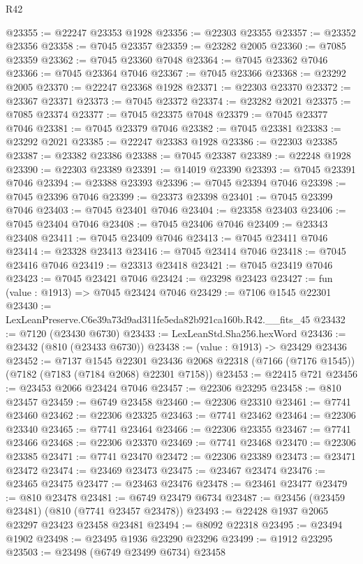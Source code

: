 \begin{lexlean}{R42}
\begin{coremodule}
{@23355 := @22247 @23353 @1928
@23356 := @22303 @23355
@23357 := @23352 @23356
@23358 := @7045 @23357
@23359 := @23282 @2005
@23360 := @7085 @23359
@23362 := @7045 @23360 @7048
@23364 := @7045 @23362 @7046
@23366 := @7045 @23364 @7046
@23367 := @7045 @23366
@23368 := @23292 @2005
@23370 := @22247 @23368 @1928
@23371 := @22303 @23370
@23372 := @23367 @23371
@23373 := @7045 @23372
@23374 := @23282 @2021
@23375 := @7085 @23374
@23377 := @7045 @23375 @7048
@23379 := @7045 @23377 @7046
@23381 := @7045 @23379 @7046
@23382 := @7045 @23381
@23383 := @23292 @2021
@23385 := @22247 @23383 @1928
@23386 := @22303 @23385
@23387 := @23382 @23386
@23388 := @7045 @23387
@23389 := @22248 @1928
@23390 := @22303 @23389
@23391 := @14019 @23390
@23393 := @7045 @23391 @7046
@23394 := @23388 @23393
@23396 := @7045 @23394 @7046
@23398 := @7045 @23396 @7046
@23399 := @23373 @23398
@23401 := @7045 @23399 @7046
@23403 := @7045 @23401 @7046
@23404 := @23358 @23403
@23406 := @7045 @23404 @7046
@23408 := @7045 @23406 @7046
@23409 := @23343 @23408
@23411 := @7045 @23409 @7046
@23413 := @7045 @23411 @7046
@23414 := @23328 @23413
@23416 := @7045 @23414 @7046
@23418 := @7045 @23416 @7046
@23419 := @23313 @23418
@23421 := @7045 @23419 @7046
@23423 := @7045 @23421 @7046
@23424 := @23298 @23423
@23427 := fun (value : @1913) => @7045 @23424 @7046
@23429 := @7106 @1545 @22301
@23430 := LexLeanPreserve.C6e39a73d9ad311fe5eda82b921ca160b.R42.__fits_45
@23432 := @7120 (@23430 @6730)
@23433 := LexLeanStd.Sha256.hexWord
@23436 := @23432 (@810 (@23433 @6730))
@23438 := (value : @1913) -> @23429 @23436
@23452 := @7137
    @1545
    @22301
    @23436
    @2068
    @22318
    (@7166 (@7176 @1545))
    (@7182 (@7183 (@7184 @2068) @22301 @7158))
@23453 := @22415 @721
@23456 := @23453 @2066 @23424 @7046
@23457 := @22306 @23295
@23458 := @810 @23457
@23459 := @6749 @23458
@23460 := @22306 @23310
@23461 := @7741 @23460
@23462 := @22306 @23325
@23463 := @7741 @23462
@23464 := @22306 @23340
@23465 := @7741 @23464
@23466 := @22306 @23355
@23467 := @7741 @23466
@23468 := @22306 @23370
@23469 := @7741 @23468
@23470 := @22306 @23385
@23471 := @7741 @23470
@23472 := @22306 @23389
@23473 := @23471 @23472
@23474 := @23469 @23473
@23475 := @23467 @23474
@23476 := @23465 @23475
@23477 := @23463 @23476
@23478 := @23461 @23477
@23479 := @810 @23478
@23481 := @6749 @23479 @6734
@23487 := @23456 (@23459 @23481) (@810 (@7741 @23457 @23478))
@23493 := @22428 @1937 @2065 @23297 @23423 @23458 @23481
@23494 := @8092 @22318
@23495 := @23494 @1902
@23498 := @23495 @1936 @23290 @23296
@23499 := @1912 @23295
@23503 := @23498 (@6749 @23499 @6734) @23458
}
\end{coremodule}
\end{lexlean}
